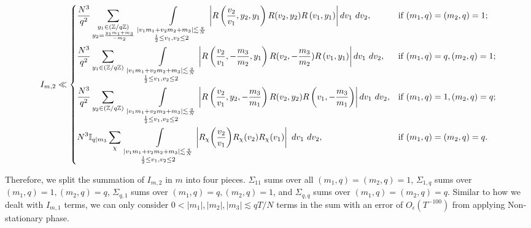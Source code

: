 \begin{align*}
    I_{m,2} \ll \begin{dcases*}
        \frac{N^3}{q^2}\sum_{\substack{y_1\in (\mathbb{Z}/q\mathbb{Z})\\y_2=\frac{y_1m_1+m_3}{-m_2}}} \ \int\displaylimits_{\substack{
            |v_1m_1+v_2m_2+m_3|\lesssim \frac{q}{N}\\
            \frac{1}{2}\leq v_1,v_2\leq 2
        }} \left| R\left(\frac{v_2}{v_1},y_2,y_1\right)
        R(v_2,y_2)R\left(v_1,y_1\right)\right| dv_1 \ dv_2, &if $(m_1,q)=(m_2,q)=1$;\\
        \frac{N^3}{q^2}\sum_{\substack{y_1\in (\mathbb{Z}/q\mathbb{Z})}}\ \int\displaylimits_{\substack{
            |v_1m_1+v_2m_2+m_3|\lesssim \frac{q}{N}\\
            \frac{1}{2}\leq v_1,v_2\leq 2
        }} \left| R\left(\frac{v_2}{v_1},-\frac{m_3}{m_2},y_1\right)
        R(v_2,-\frac{m_3}{m_2})R\left(v_1,y_1\right)\right| dv_1 \ dv_2
        ,& if $(m_1,q)=q, (m_2,q)=1$;\\
        \frac{N^3}{q^2}\sum_{\substack{y_2\in (\mathbb{Z}/q\mathbb{Z})}}\ \int\displaylimits_{\substack{
            |v_1m_1+v_2m_2+m_3|\lesssim \frac{q}{N}\\
            \frac{1}{2}\leq v_1,v_2\leq 2
        }} \left| R\left(\frac{v_2}{v_1},y_2,-\frac{m_3}{m_1}\right)
        R(v_2,y_2)R\left(v_1,-\frac{m_3}{m_1}\right)\right| dv_1 \ dv_2,& if $(m_1,q)=1,(m_2,q)=q$;\\
        N^3\mathbb{I}_{q|m_3} \sum_{\chi}\ \int\displaylimits_{\substack{
            |v_1m_1+v_2m_2+m_3|\lesssim \frac{q}{N}\\
            \frac{1}{2}\leq v_1,v_2\leq 2
    }} \left| R_{\chi}{\left(\frac{v_2}{v_1}\right)}R_{\chi} {\left(v_2\right)}R_{\chi}{\left(v_1\right)} \right|\ dv_1\ dv_2, & if $ (m_1,q)=(m_2,q)=q.$\\
    \end{dcases*}
\end{align*}

Therefore, we split the summation of $I_{m,2}$ in $m$ into four pieces. $\Sigma_{11}$ sums over all $(m_1,q)=(m_2,q)=1$, $\Sigma_{1,q}$ sums over $(m_1,q)=1, (m_2,q)=q$, $\Sigma_{q,1}$ sums over $(m_1,q)=q,(m_2,q)=1$, and $\Sigma_{q,q}$ sums over $(m_1,q)=(m_2,q)=q$. Similar to how we dealt with $I_{m,1}$ terms, we can only consider $0<|m_1|,|m_2|,|m_3|\lesssim qT/N$ terms in the sum with an error of $O_\epsilon({T^{-100}})$ from applying Non-stationary phase.

